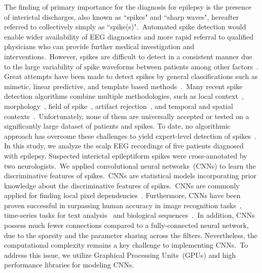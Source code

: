 \documentclass{article}
\begin{document}
The finding of primary importance for the diagnosis for epilepsy is the presence of interictal discharges, also known as ``spikes" and ``sharp waves", hereafter referred to collectively simply as ``spike(s)".~Automated spike detection would enable wider availability of EEG diagnostics and more rapid referral to qualified physicians who can provide further medical
investigation and interventions.~However, spikes are difficult to detect in a consistent manner due to the large variability of spike waveforms between patients among other factors~\cite{jin2014spikegui}.
Great attempts have been made to detect spikes by general classifications such as mimetic, linear predictive, and template based methods~\cite{wilson2002spike}.~Many recent spike detection algorithms combine multiple methodologies, such as local context~\cite{gotman1992state,guedes1983spike,wilson1999spike},
morphology~\cite{gotman1991state,guedes1983spike,wilson1999spike,faure1985attributed,davey1989expert,webber1994practical},
field of spike~\cite{gotman1991state,wilson1999spike,gabor1992automated,webber1994practical,ramabhadran1999automated},
artifact rejection~\cite{gotman1991state,guedes1983spike,wilson1999spike}, and temporal and spatial contexts~\cite{gotman1991state,ramabhadran1999automated,black2000real}.~Unfortunately, none of them are universally accepted or tested on a significantly large dataset of patients and spikes. To date, no algorithmic approach has overcome these challenges to yield expert-level detection of spikes~\cite{jin2014spikegui}.\\

In this study, we analyze the scalp EEG recordings of five patients diagnosed with epilepsy. Suspected interictal epileptiform spikes were cross-annotated by two neurologists.~We applied convolutional neural networks~(CNNs) to learn the discriminative features of spikes.~CNNs are statistical models incorporating prior knowledge about the discriminative features of spikes.~CNNs are commonly applied for finding local pixel dependencies~\cite{NIPS2012_4824}.
Furthermore, CNNs have been proven successful in surpassing human accuracy in image recognition tasks~\cite{DBLP:journals/corr/HeZR015}, time-series tasks for text analysis~\cite{DBLP:journals/corr/ZhangL15} and biological sequences~\cite{sonderby2015convolutional}.~In addition, CNNs possess much fewer connections compared to a fully-connected neural network, due to the sparsity and the parameter sharing across the filters. Nevertheless, the computational complexity remains a key challenge to implementing CNNs.~To address this issue, we utilize Graphical Processing Units~(GPUs) and high performance libraries for modeling CNNs. \\
\end{document}
